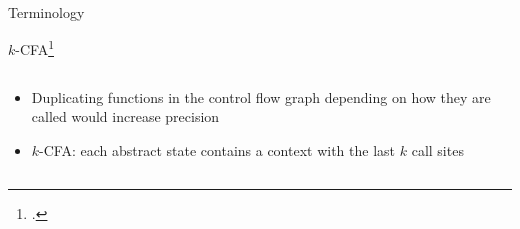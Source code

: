 \begin{frame}{Terminology}
\end{frame}
        
\begin{frame}{$k$-CFA\footcite{shivers1991control}}
  \begin{columns}
  \begin{column}{0.5\textwidth}
  \begin{itemize}
  \item<2-> Duplicating functions in the control flow graph depending on
    how they are called would increase precision
  \item<3-> $k$-CFA: each abstract state contains a context with the last
    $k$ call sites
  \end{itemize}
  \end{column}

  \begin{column}{0.5\textwidth}
  \end{column}
  \end{columns}
\end{frame}

